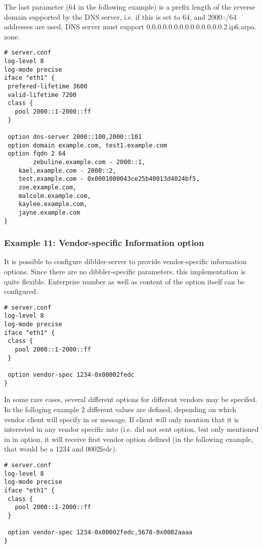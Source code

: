 The last parameter (64 in the following example) is a prefix length of
the reverse domain supported by the DNS server, i.e. if this is set to
64, and 2000::/64 addresses are used, DNS server must support
0.0.0.0.0.0.0.0.0.0.0.0.0.0.2.ip6.arpa. zone.

\begin{lstlisting}
# server.conf
log-level 8
log-mode precise
iface "eth1" {
 prefered-lifetime 3600
 valid-lifetime 7200
 class {
   pool 2000::1-2000::ff
 }

 option dns-server 2000::100,2000::101
 option domain example.com, test1.example.com
 option fqdn 2 64
        zebuline.example.com - 2000::1,
	kael.example.com - 2000::2,
	test.example.com - 0x0001000043ce25b40013d4024bf5,
	zoe.example.com,
	malcolm.example.com,
	kaylee.example.com,
	jayne.example.com
}
\end{lstlisting}

\subsubsection{Example 11: Vendor-specific Information option}
\label{example-server-vendor-spec}
It is possible to configure dibbler-server to provide vendor-specific
information options. Since there are no dibbler-specific parameters,
this implementation is quite flexible. Enterprise number as well as
content of the option itself can be configured. 

\begin{lstlisting}
# server.conf
log-level 8
log-mode precise
iface "eth1" {
 class {
   pool 2000::1-2000::ff
 }

 option vendor-spec 1234-0x00002fedc
}
\end{lstlisting}

In some rare cases, several different options for different vendors
may be specifed. In the folloging example 2 different values are
defined, depending on which vendor client will specify in  or
 message. If client will only mention that it is interested in
any vendor specific into (i.e. did not sent  option, but
only mentioned in in  option, it will receive
first vendor option defined (in the following example, that would be a
1234 and 0002fedc).

\begin{lstlisting}
# server.conf
log-level 8
log-mode precise
iface "eth1" {
 class {
   pool 2000::1-2000::ff
 }

 option vendor-spec 1234-0x00002fedc,5678-0x0002aaaa
}
\end{lstlisting}

